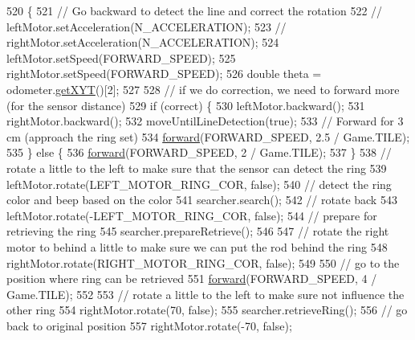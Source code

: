 \begin{DoxyCode}
520                                                                                    \{
521     \textcolor{comment}{// Go backward to detect the line and correct the rotation}
522     \textcolor{comment}{// leftMotor.setAcceleration(N\_ACCELERATION);}
523     \textcolor{comment}{// rightMotor.setAcceleration(N\_ACCELERATION);}
524     leftMotor.setSpeed(FORWARD\_SPEED);
525     rightMotor.setSpeed(FORWARD\_SPEED);
526     \textcolor{keywordtype}{double} theta = odometer.\hyperlink{classca_1_1mcgill_1_1ecse211_1_1odometer_1_1_odometer_data_a8f40f0264c68f0cbed4fff1723ae7863}{getXYT}()[2];
527 
528     \textcolor{comment}{// if we do correction, we need to forward more (for the sensor distance)}
529     \textcolor{keywordflow}{if} (correct) \{
530       leftMotor.backward();
531       rightMotor.backward();
532       moveUntilLineDetection(\textcolor{keyword}{true});
533       \textcolor{comment}{// Forward for 3 cm (approach the ring set)}
534       \hyperlink{classca_1_1mcgill_1_1ecse211_1_1project_1_1_navigation_a7c66610c5b7496ddb35d342ab2cd3f08}{forward}(FORWARD\_SPEED, 2.5 / Game.TILE);
535     \} \textcolor{keywordflow}{else} \{
536       \hyperlink{classca_1_1mcgill_1_1ecse211_1_1project_1_1_navigation_a7c66610c5b7496ddb35d342ab2cd3f08}{forward}(FORWARD\_SPEED, 2 / Game.TILE);
537     \}
538     \textcolor{comment}{// rotate a little to the left to make sure that the sensor can detect the ring}
539     leftMotor.rotate(LEFT\_MOTOR\_RING\_COR, \textcolor{keyword}{false});
540     \textcolor{comment}{// detect the ring color and beep based on the color}
541     searcher.search();
542     \textcolor{comment}{// rotate back}
543     leftMotor.rotate(-LEFT\_MOTOR\_RING\_COR, \textcolor{keyword}{false});
544     \textcolor{comment}{// prepare for retrieving the ring}
545     searcher.prepareRetrieve();
546 
547     \textcolor{comment}{// rotate the right motor to behind a little to make sure we can put the rod behind the ring}
548     rightMotor.rotate(RIGHT\_MOTOR\_RING\_COR, \textcolor{keyword}{false});
549 
550     \textcolor{comment}{// go to the position where ring can be retrieved}
551     \hyperlink{classca_1_1mcgill_1_1ecse211_1_1project_1_1_navigation_a7c66610c5b7496ddb35d342ab2cd3f08}{forward}(FORWARD\_SPEED, 4 / Game.TILE);
552 
553     \textcolor{comment}{// rotate a little to the left to make sure not influence the other ring}
554     rightMotor.rotate(70, \textcolor{keyword}{false});
555     searcher.retrieveRing();
556     \textcolor{comment}{// go back to original position}
557     rightMotor.rotate(-70, \textcolor{keyword}{false});

\end{DoxyCode}
